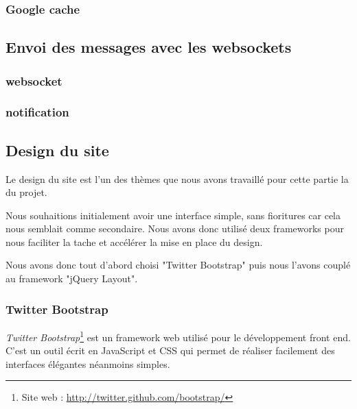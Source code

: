 \subsubsection{Google cache}




\subsection{Envoi des messages avec les websockets}



\subsubsection{websocket}

\subsubsection{notification}



\subsection{Design du site}

Le design du site est l'un des thèmes que nous avons travaillé pour cette partie la du projet.

Nous souhaitions initialement avoir une interface simple, sans fioritures car cela nous semblait comme
secondaire. Nous avons donc utilisé deux frameworks pour nous faciliter la tache et accélérer la mise
en place du design.

Nous avons donc tout d'abord choisi "Twitter Bootstrap" puis nous l'avons couplé au framework "jQuery
Layout".
\\


\subsubsection{Twitter Bootstrap}

\textit{Twitter Bootstrap}\footnote{Site web : \href{http://twitter.github.com/bootstrap/}{http://twitter.github.com/bootstrap/}} est un framework web utilisé pour le développement front end.
C'est un outil écrit en JavaScript et CSS qui permet de réaliser facilement des interfaces élégantes néanmoins simples. 


